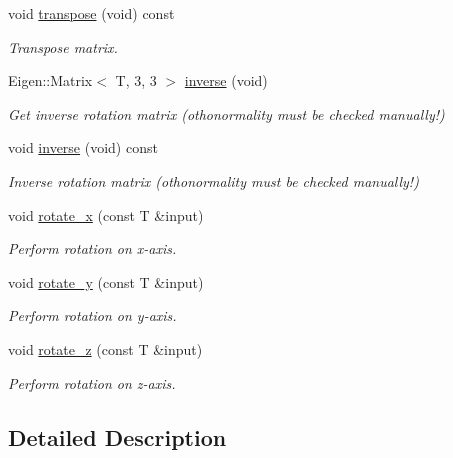 \begin{DoxyCompactItemize}
void \hyperlink{classddd_1_1rotation_aaeb56c20ff04304b991ae382dcd06829}{transpose} (void) const
\begin{DoxyCompactList}\small\item\em Transpose matrix. \end{DoxyCompactList}\item 
\mbox{\label{classddd_1_1rotation_ae27db71440b3473d16f3ffae6d963b31}} 
Eigen\+::\+Matrix$<$ T, 3, 3 $>$ \hyperlink{classddd_1_1rotation_ae27db71440b3473d16f3ffae6d963b31}{inverse} (void)
\begin{DoxyCompactList}\small\item\em Get inverse rotation matrix (othonormality must be checked manually!) \end{DoxyCompactList}\item 
\mbox{\label{classddd_1_1rotation_a6736628a6252a8373c567884f84c2f2d}} 
void \hyperlink{classddd_1_1rotation_a6736628a6252a8373c567884f84c2f2d}{inverse} (void) const
\begin{DoxyCompactList}\small\item\em Inverse rotation matrix (othonormality must be checked manually!) \end{DoxyCompactList}\item 
void \hyperlink{classddd_1_1rotation_af4bd213ca0cf7d372f840cbfd9d37696}{rotate\+\_\+x} (const T \&input)
\begin{DoxyCompactList}\small\item\em Perform rotation on x-\/axis. \end{DoxyCompactList}\item 
void \hyperlink{classddd_1_1rotation_a4f883c5c4c736387fa14f1362d90a90c}{rotate\+\_\+y} (const T \&input)
\begin{DoxyCompactList}\small\item\em Perform rotation on y-\/axis. \end{DoxyCompactList}\item 
void \hyperlink{classddd_1_1rotation_a3ef52c0cd324e1ef83fcb65dba746e10}{rotate\+\_\+z} (const T \&input)
\begin{DoxyCompactList}\small\item\em Perform rotation on z-\/axis. \end{DoxyCompactList}\end{DoxyCompactItemize}


\subsection{Detailed Description}
